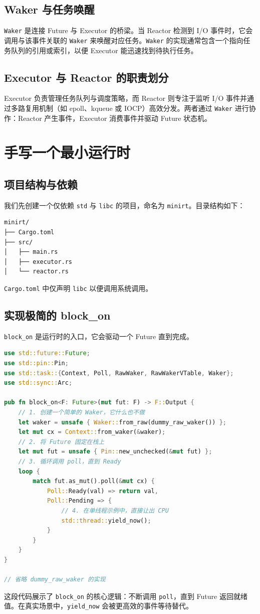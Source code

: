 \section{Waker 与任务唤醒}
\texttt{Waker} 是连接 Future 与 Executor 的桥梁。当 Reactor 检测到 I/O 事件时，它会调用与该事件关联的 \texttt{Waker} 来唤醒对应任务。\texttt{Waker} 的实现通常包含一个指向任务队列的引用或索引，以便 Executor 能迅速找到待执行任务。\par
\section{Executor 与 Reactor 的职责划分}
Executor 负责管理任务队列与调度策略，而 Reactor 则专注于监听 I/O 事件并通过多路复用机制（如 epoll、kqueue 或 IOCP）高效分发。两者通过 \texttt{Waker} 进行协作：Reactor 产生事件，Executor 消费事件并驱动 Future 状态机。\par
\chapter{手写一个最小运行时}
\section{项目结构与依赖}
我们先创建一个仅依赖 \texttt{std} 与 \texttt{libc} 的项目，命名为 \texttt{minirt}。目录结构如下：\par
\begin{lstlisting}
minirt/
├── Cargo.toml
├── src/
│   ├── main.rs
│   ├── executor.rs
│   └── reactor.rs
\end{lstlisting}
\texttt{Cargo.toml} 中仅声明 \texttt{libc} 以便调用系统调用。\par
\section{实现极简的 block\_{}on}
\texttt{block\_{}on} 是运行时的入口，它会驱动一个 Future 直到完成。\par
\begin{lstlisting}[language=rust]
use std::future::Future;
use std::pin::Pin;
use std::task::{Context, Poll, RawWaker, RawWakerVTable, Waker};
use std::sync::Arc;

pub fn block_on<F: Future>(mut fut: F) -> F::Output {
    // 1. 创建一个简单的 Waker，它什么也不做
    let waker = unsafe { Waker::from_raw(dummy_raw_waker()) };
    let mut cx = Context::from_waker(&waker);
    // 2. 将 Future 固定在栈上
    let mut fut = unsafe { Pin::new_unchecked(&mut fut) };
    // 3. 循环调用 poll，直到 Ready
    loop {
        match fut.as_mut().poll(&mut cx) {
            Poll::Ready(val) => return val,
            Poll::Pending => {
                // 4. 在单线程示例中，直接让出 CPU
                std::thread::yield_now();
            }
        }
    }
}

// 省略 dummy_raw_waker 的实现
\end{lstlisting}
这段代码展示了 \texttt{block\_{}on} 的核心逻辑：不断调用 \texttt{poll}，直到 Future 返回就绪值。在真实场景中，\texttt{yield\_{}now} 会被更高效的事件等待替代。\par
